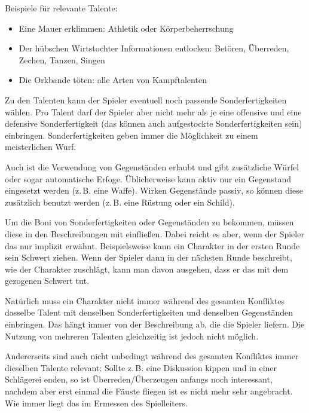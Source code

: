 \begin{beispiel}
Beispiele für relevante Talente:
\begin{itemize}
  \item Eine Mauer erklimmen: Athletik oder Körperbeherrschung
  \item Der hübschen Wirtstochter Informationen entlocken: Betören, Überreden, Zechen, Tanzen, Singen
  \item Die Orkbande töten: alle Arten von Kampftalenten
\end{itemize}
\end{beispiel}

Zu den Talenten kann der Spieler eventuell noch passende Sonderfertigkeiten wählen. Pro Talent darf der Spieler aber nicht mehr als je eine offensive und eine defensive Sonderfertigkeit (das können auch aufgestockte Sonderfertigkeiten sein) einbringen. Sonderfertigkeiten geben immer die Möglichkeit zu einem meisterlichen Wurf.

Auch ist die Verwendung von Gegenständen erlaubt und gibt zusätzliche Würfel oder sogar automatische Erfoge. Üblicherweise kann aktiv nur ein Gegenstand eingesetzt werden (z.\,B. eine Waffe). Wirken Gegenstände passiv, so können diese zusätzlich benutzt werden (z.\,B. eine Rüstung oder ein Schild).

Um die Boni von Sonderfertigkeiten oder Gegenständen zu bekommen, müssen diese in den Beschreibungen mit einfließen. Dabei reicht es aber, wenn der Spieler das nur implizit erwähnt. Beispielsweise kann ein Charakter in der ersten Runde sein Schwert ziehen. Wenn der Spieler dann in der nächsten Runde beschreibt, wie der Charakter zuschlägt, kann man davon ausgehen, dass er das mit dem gezogenen Schwert tut.

Natürlich muss ein Charakter nicht immer während des gesamten Konfliktes dasselbe Talent mit denselben Sonderfertigkeiten und denselben Gegenständen einbringen. Das hängt immer von der Beschreibung ab, die die Spieler liefern. Die Nutzung von mehreren Talenten gleichzeitig ist jedoch nicht möglich.

Andererseits sind auch nicht unbedingt während des gesamten Konfliktes immer dieselben Talente relevant: Sollte z.\,B. eine Diskussion kippen und in einer Schlägerei enden, so ist Überreden/Überzeugen anfangs noch interessant, nachdem aber erst einmal die Fäuste fliegen ist es nicht mehr sehr angebracht. Wie immer liegt das im Ermessen des Spielleiters.

